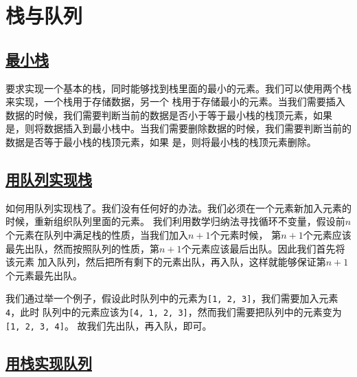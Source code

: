 \documentclass[../../main.tex]{subfiles}
\begin{document}
\section{栈与队列}

\subsection{\href{https://leetcode-cn.com/problems/min-stack/}{最小栈}}

要求实现一个基本的栈，同时能够找到栈里面的最小的元素。我们可以使用两个栈来实现，一个栈用于存储数据，另一个
栈用于存储最小的元素。当我们需要插入数据的时候，我们需要判断当前的数据是否小于等于最小栈的栈顶元素，如果
是，则将数据插入到最小栈中。当我们需要删除数据的时候，我们需要判断当前的数据是否等于最小栈的栈顶元素，如果
是，则将最小栈的栈顶元素删除。



\subsection{\href{https://leetcode.cn/problems/implement-stack-using-queues/}{用队列实现栈}}

如何用队列实现栈了。我们没有任何好的办法。我们必须在一个元素新加入元素的时候，重新组织队列里面的元素。
我们利用数学归纳法寻找循环不变量，假设前$n$个元素在队列中满足栈的性质，当我们加入$n + 1$个元素时候，
第$n + 1$个元素应该最先出队，然而按照队列的性质，第$n + 1$个元素应该最后出队。因此我们首先将该元素
加入队列，然后把所有剩下的元素出队，再入队，这样就能够保证第$n + 1$个元素最先出队。

\begin{example}
  我们通过举一个例子，假设此时队列中的元素为\texttt{[1, 2, 3]}，我们需要加入元素\texttt{4}，此时
  队列中的元素应该为\texttt{[4, 1, 2, 3]}，然而我们需要把队列中的元素变为\texttt{[1, 2, 3, 4]}。
  故我们先出队，再入队，即可。
\end{example}



\subsection{\href{https://leetcode-cn.com/problems/implement-queue-using-stacks/}{用栈实现队列}}
\end{document}
